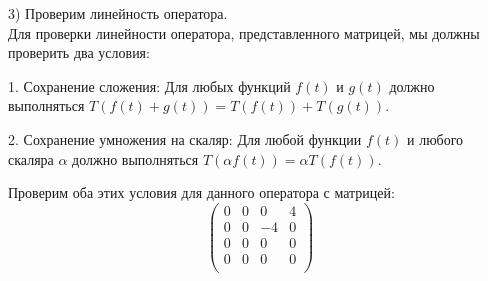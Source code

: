 \documentclass{article}
\begin{document}
3) Проверим линейность оператора.\\


Для проверки линейности оператора, представленного матрицей, мы должны проверить два условия:

1. Сохранение сложения:
   Для любых функций $f(t)$ и $g(t)$ должно выполняться $T(f(t) + g(t)) = T(f(t)) + T(g(t))$.

2. Сохранение умножения на скаляр:
   Для любой функции $f(t)$ и любого скаляра $\alpha$ должно выполняться $T(\alpha f(t)) = \alpha T(f(t))$.

Проверим оба этих условия для данного оператора с матрицей:
\[
\begin{pmatrix}
0 & 0 & 0 & 4 \\
0 & 0 & -4 & 0 \\
0 & 0 & 0 & 0 \\
0 & 0 & 0 & 0 \\
\end{pmatrix}
\]
\end{document}
